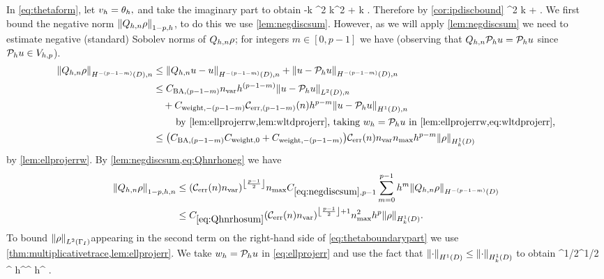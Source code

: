 In \cref{eq:thetaform}, let $v_{h} = \theta_{h},$ and take the imaginary part to obtain
\beq\label{eq:boundboundarybelow}
-k \NLtGI{\thetah}^2 \leq \Im k^2 \IPLtDn{\Qhn \rho}{\thetah} + \Re k \IPLtGI{\rho}{\thetah}.
\eeq
Therefore by \cref{cor:ipdiscbound}
\beq
\NLtGI{\thetah}^2 \leq  k  + \NLtGI{\rho}\NLtGI{\thetah}.\label{eq:thetaboundarypart}
\eeq
We first bound the negative norm $\Nfn{1-p,h}{\Qhn\rho}$, to do this we use \cref{lem:negdiscsum}. However, as we will apply \cref{lem:negdiscsum} we need to estimate negative (standard) Sobolev norms of $Q_{h,n}\rho$; for integers $m \in [0,p-1]$ we have (observing that $Q_{h,n} \mathcal P_{h} u = \mathcal P_{h} u$ since $\mathcal P_{h} u \in V_{h,p}$).
\begin{align}
\NHnfn{-(p-1-m)}{D}{\Qhn\rho} &\leq \NHnfn{-(p-1-m)}{D}{\Qhn u - u} + \NHnfn{-(p-1-m)}{D}{u - \Ph u}\nonumber\\
&\leq \CSZfn{(p-1-m)} \nvar h^{(p-1-m)} \NLtDn{u-\Ph u}\nonumber\\
&\quad+ \Cwfn{-(p-1-m)}\errn{(p-1-m)} h^{p-m} \NHoDn{u - \Ph u}\nonumber\\
&\quad\quad\text{ by \cref{lem:ellprojerrw,lem:wltdprojerr}, taking } \wh = \Ph u \text{ in \cref{lem:ellprojerrw,eq:wltdprojerr},}\nonumber\\
&\leq \mleft(\CSZfn{(p-1-m)} \Cwz + \Cwfn{-(p-1-m)}\mright)\En\nvar\nmax h^{p-m} \NHokD{\rho}\label{eq:Qhnrhoneg}
\end{align}
by \cref{lem:ellprojerrw}. By \cref{lem:negdiscsum,eq:Qhnrhoneg} we have
\begin{align}
\Nfn{1-p,h,n}{\Qhn \rho}&\leq \mleft(\En\nvar\mright)^{\floor{\frac{p-1}2}}\nmax \Csumfn{p-1} \sum_{m=0}^{p-1} h^{m} \NHfn{-(p-1-m)}{D}{\Qhn \rho} \nonumber\\
&\leq \Cmess \mleft(\En\nvar\mright)^{\floor{\frac{p-1}2}+1}\nmax^2 h^p \NHokD{\rho}.\label{eq:Qhnrhosum}
\end{align}
To bound $\NLtGI{\rho}$appearing in  the second term on the right-hand side of \cref{eq:thetaboundarypart} we use \cref{thm:multiplicativetrace,lem:ellprojerr}. We take $w_{h} = \mathcal P_{h} u$ in \cref{eq:ellprojerr} and use the fact that $\NHoD{\cdot} \leq \NHokD{\cdot}$ to obtain
\beq\label{eq:rhomtbound}
\NLtGI{\rho} \leq \CMT\NHoD{\rho}^{1/2}\NLtD{\rho}^{1/2} \leq \CMT {}^{\half} h^\half \NHoD{\rho}\leq \CMT {}^{\half} h^{\half} \NHokD{\rho}.
